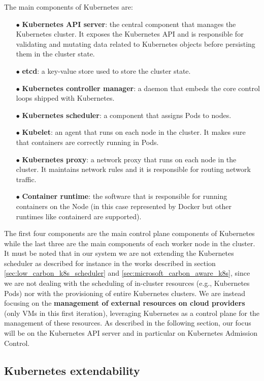 The main components of Kubernetes are:
\begin{itemize}[itemsep=0.2pt, topsep=1pt]
    \item[$\bullet$] \textbf{Kubernetes API server}: the central component that manages the Kubernetes cluster. It exposes the Kubernetes API and is responsible for validating and mutating data related to Kubernetes objects before persisting them in the cluster state.
    \item[$\bullet$] \textbf{etcd}: a key-value store used to store the cluster state.
    \item[$\bullet$] \textbf{Kubernetes controller manager}: a daemon that embeds the core control loops shipped with Kubernetes.
    \item[$\bullet$] \textbf{Kubernetes scheduler}: a component that assigns Pods to nodes.
    \item[$\bullet$] \textbf{Kubelet}: an agent that runs on each node in the cluster. It makes sure that containers are correctly running in Pods.
    \item[$\bullet$] \textbf{Kubernetes proxy}: a network proxy that runs on each node in the cluster. It maintains network rules and it is responsible for routing network traffic.
    \item[$\bullet$] \textbf{Container runtime}: the software that is responsible for running containers on the Node (in this case represented by Docker but other runtimes like containerd are supported).
\end{itemize}

The first four components are the main control plane components of Kubernetes while the last three are the main components of each worker node in the cluster.
It must be noted that in our system we are not extending the Kubernetes scheduler as described for instance in the works described in section \ref{sec:low_carbon_k8s_scheduler} and \ref{sec:microsoft_carbon_aware_k8s}, since we are not dealing with the scheduling of in-cluster resources (e.g., Kubernetes Pods) nor with the provisioning of entire Kubernetes clusters.
We are instead focusing on the \textbf{management of external resources on cloud providers} (only VMs in this first iteration), leveraging Kubernetes as a control plane for the management of these resources.
As described in the following section, our focus will be on the Kubernetes API server and in particular on Kubernetes Admission Control.

\subsection{Kubernetes extendability}
\label{sec:kubernetes_extendability}

